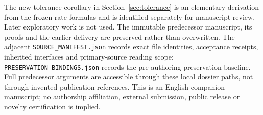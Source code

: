\documentclass[11pt]{article}
\theoremstyle{remark}\newtheorem{remark}[theorem]{Remark}
\newcommand{\1}{\mathbf 1}
\begin{document}
The new tolerance corollary in Section~\ref{sec:tolerance} is an elementary derivation from the frozen rate formulas and is identified separately for manuscript review. Later exploratory work is not used. The immutable predecessor manuscript, its proofs and the earlier delivery are preserved rather than overwritten. The adjacent \texttt{SOURCE\_MANIFEST.json} records exact file identities, acceptance receipts, inherited interfaces and primary-source reading scope; \texttt{PRESERVATION\_BINDINGS.json} records the pre-authoring preservation baseline. Full predecessor arguments are accessible through these local dossier paths, not through invented publication references. This is an English companion manuscript; no authorship affiliation, external submission, public release or novelty certification is implied.



\end{document}
